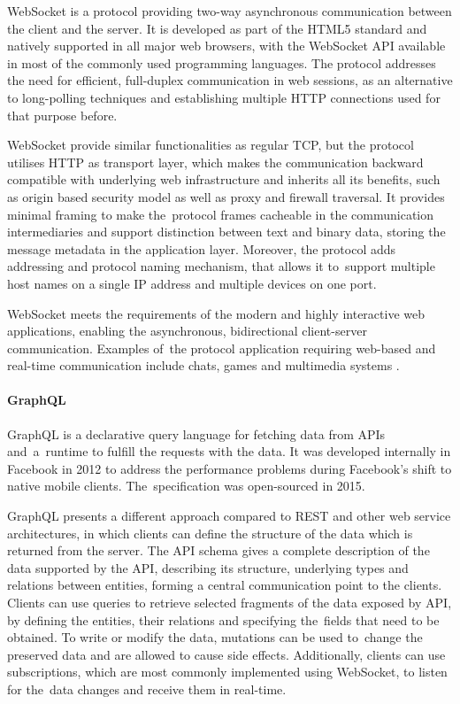 WebSocket \cite{WebSocketRFC} is a protocol providing two-way asynchronous communication between the client and the server. It is developed as part of the HTML5 standard and natively supported in all major web browsers, with the WebSocket API available in most of the commonly used programming languages. The protocol addresses the need for efficient, full-duplex communication in web sessions, as an alternative to long-polling techniques and establishing multiple HTTP connections used for that purpose before.

WebSocket provide similar functionalities as regular TCP, but the protocol utilises HTTP as transport layer, which makes the communication backward compatible with underlying web infrastructure and inherits all its benefits, such as origin based security model as well as proxy and firewall traversal. It provides minimal framing to make the~protocol frames cacheable in the communication intermediaries and support distinction between text and binary data, storing the message metadata in the application layer. Moreover, the protocol adds addressing and protocol naming mechanism, that allows it to~support multiple host names on a single IP address and multiple devices on one port.

WebSocket meets the requirements of the modern and highly interactive web applications, enabling the asynchronous, bidirectional client-server communication. Examples of~the protocol application requiring web-based and real-time communication include chats, games and multimedia systems \cite{PerfomranceEvaluationonWebsocketProtocol}.

\paragraph{GraphQL}

GraphQL \cite{GraphQL} is a declarative query language for fetching data from APIs and~a~runtime to fulfill the requests with the data. It was developed internally in Facebook in 2012 to address the performance problems during Facebook's shift to native mobile clients. The~specification was open-sourced in 2015.

GraphQL presents a different approach compared to REST and other web service architectures, in which clients can define the structure of the data which is returned from the server. The API schema gives a complete description of the data supported by the API, describing its structure, underlying types and relations between entities, forming a central communication point to the clients.
Clients can use queries to retrieve selected fragments of the data exposed by API, by defining the entities, their relations and specifying the~fields that need to be obtained. To write or modify the data, mutations can be used to~change the preserved data and are allowed to cause side effects.
Additionally, clients can use subscriptions, which are most commonly implemented using WebSocket, to listen for the~data changes and receive them in real-time.

